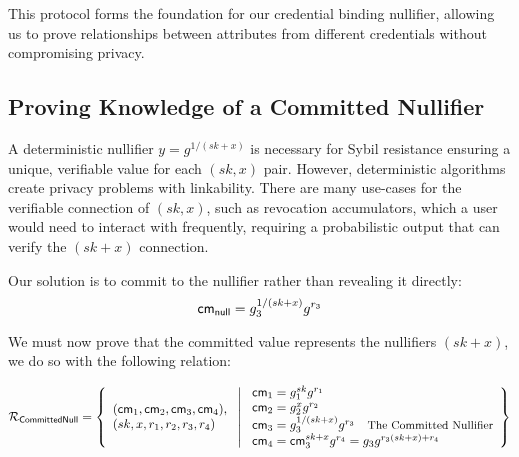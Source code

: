 This protocol forms the foundation for our credential binding nullifier, allowing us to prove relationships between attributes from different credentials without compromising privacy.





































\subsection{Proving Knowledge of a Committed Nullifier}

A deterministic nullifier $y = g^{1/(sk+x)}$ is necessary for Sybil resistance ensuring a unique, verifiable value for each $(sk,x)$ pair. However, deterministic algorithms create privacy problems with linkability. There are many use-cases for the verifiable connection of $(sk, x)$, such as revocation accumulators, which a user would need to interact with frequently, requiring a probabilistic output that can verify the $(sk+x)$ connection. 

Our solution is to commit to the nullifier rather than revealing it directly:
\[
\mathsf{cm}_{\mathsf{null}} = g_3^{1/(sk+x)} g^{r_3}
\]

We must now prove that the committed value represents the nullifiers $(sk+x)$, we do so with the following relation:


\[
\mathcal{R}_{\mathsf{CommittedNull}} = \left\{ 
\begin{array}{l} 
(\mathsf{cm}_1, \mathsf{cm}_2, \mathsf{cm}_3, \mathsf{cm}_4), \\
(sk, x, r_1, r_2, r_3, r_4) 
\end{array}
\ \middle| \
\begin{array}{l}
\mathsf{cm}_1 = g_1^{sk} g^{r_1} \\
\mathsf{cm}_2 = g_2^{x} g^{r_2} \\
\mathsf{cm}_3 = g_3^{1/(sk + x)} g^{r_3}  \quad \text{\small{The Committed Nullifier}}\\
\mathsf{cm}_4 = \mathsf{cm}_3^{sk + x} g^{r_4} = g_3 g^{r_3 (sk + x) + r_4}
\end{array} \right\}
\]

